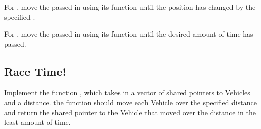 \documentclass{tufte-handout}
\begin{document}
For , move the  passed in using its  function until the position has changed by the specified . \newline \medskip

For , move the  passed in using its  function until the desired amount of time has passed.

\subsection{Race Time!}
Implement the function , which takes in a vector of shared pointers to Vehicles and a distance.
the function should move each Vehicle over the specified distance and return the shared pointer to the Vehicle that moved over the distance in the least amount of time.
\end{document}
